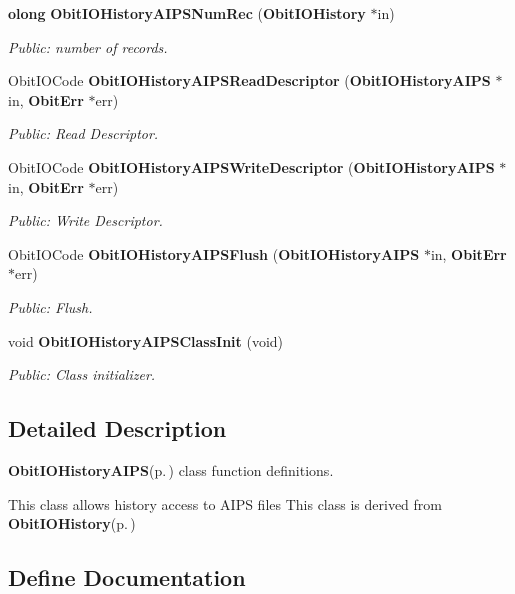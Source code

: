 \begin{CompactItemize}
{\bf olong} {\bf Obit\-IOHistory\-AIPSNum\-Rec} ({\bf Obit\-IOHistory} $\ast$in)
\begin{CompactList}\small\item\em Public: number of records. \item\end{CompactList}\item 
Obit\-IOCode {\bf Obit\-IOHistory\-AIPSRead\-Descriptor} ({\bf Obit\-IOHistory\-AIPS} $\ast$in, {\bf Obit\-Err} $\ast$err)
\begin{CompactList}\small\item\em Public: Read Descriptor. \item\end{CompactList}\item 
Obit\-IOCode {\bf Obit\-IOHistory\-AIPSWrite\-Descriptor} ({\bf Obit\-IOHistory\-AIPS} $\ast$in, {\bf Obit\-Err} $\ast$err)
\begin{CompactList}\small\item\em Public: Write Descriptor. \item\end{CompactList}\item 
Obit\-IOCode {\bf Obit\-IOHistory\-AIPSFlush} ({\bf Obit\-IOHistory\-AIPS} $\ast$in, {\bf Obit\-Err} $\ast$err)
\begin{CompactList}\small\item\em Public: Flush. \item\end{CompactList}\item 
void {\bf Obit\-IOHistory\-AIPSClass\-Init} (void)
\begin{CompactList}\small\item\em Public: Class initializer. \item\end{CompactList}\end{CompactItemize}


\subsection{Detailed Description}
{\bf Obit\-IOHistory\-AIPS}{\rm (p.\,\pageref{structObitIOHistoryAIPS})} class function definitions. 

This class allows history access to AIPS files This class is derived from {\bf Obit\-IOHistory}{\rm (p.\,\pageref{structObitIOHistory})}

\subsection{Define Documentation}
